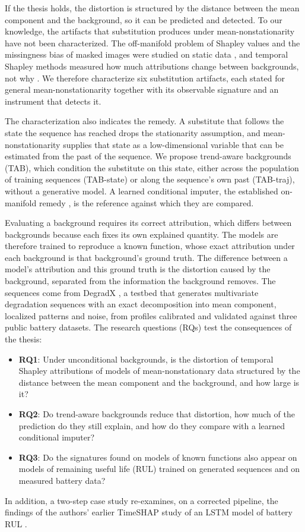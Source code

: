 \documentclass{article}
\begin{document}
If the thesis holds, the distortion is structured by the distance between the mean component and the background, so it can be predicted and detected. To our knowledge, the artifacts that substitution produces under mean-nonstationarity have not been characterized. The off-manifold problem of Shapley values and the missingness bias of masked images were studied on static data \citep{frye2021shapley, jain2022missingness}, and temporal Shapley methods measured how much attributions change between backgrounds, not why \citep{kim2026groupsegment, papadeas2026empirical}. We therefore characterize six substitution artifacts, each stated for general mean-nonstationarity together with its observable signature and an instrument that detects it.

The characterization also indicates the remedy. A substitute that follows the state the sequence has reached drops the stationarity assumption, and mean-nonstationarity supplies that state as a low-dimensional variable that can be estimated from the past of the sequence. We propose trend-aware backgrounds (TAB), which condition the substitute on this state, either across the population of training sequences (TAB-state) or along the sequence's own past (TAB-traj), without a generative model. A learned conditional imputer, the established on-manifold remedy \citep{frye2021shapley, chang2019explaining}, is the reference against which they are compared.

Evaluating a background requires its correct attribution, which differs between backgrounds because each fixes its own explained quantity. The models are therefore trained to reproduce a known function, whose exact attribution under each background is that background's ground truth. The difference between a model's attribution and this ground truth is the distortion caused by the background, separated from the information the background removes. The sequences come from DegradX \citep{degradx2026}, a testbed that generates multivariate degradation sequences with an exact decomposition into mean component, localized patterns and noise, from profiles calibrated and validated against three public battery datasets. The research questions (RQs) test the consequences of the thesis:
\begin{itemize}
    \item \textbf{RQ1}: Under unconditional backgrounds, is the distortion of temporal Shapley attributions of models of mean-nonstationary data structured by the distance between the mean component and the background, and how large is it?
    \item \textbf{RQ2}: Do trend-aware backgrounds reduce that distortion, how much of the prediction do they still explain, and how do they compare with a learned conditional imputer?
    \item \textbf{RQ3}: Do the signatures found on models of known functions also appear on models of remaining useful life (RUL) trained on generated sequences and on measured battery data?
\end{itemize}
In addition, a two-step case study re-examines, on a corrected pipeline, the findings of the authors' earlier TimeSHAP study of an LSTM model of battery RUL \citep{mishchuk2026explaining}.
\end{document}
